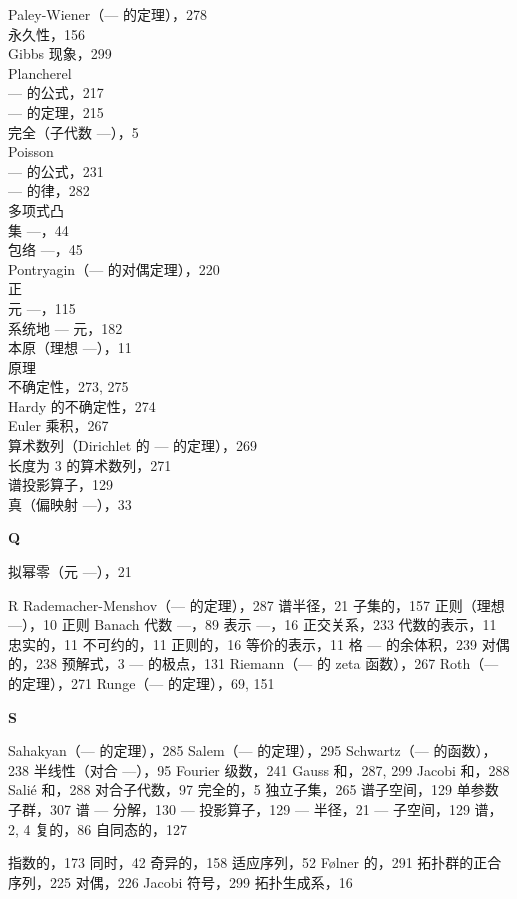 Paley-Wiener（--- 的定理），278\\
永久性，156\\
Gibbs 现象，299\\
Plancherel\\
--- 的公式，217\\
--- 的定理，215\\
完全（子代数 ---），5\\
Poisson\\
--- 的公式，231\\
--- 的律，282\\
多项式凸\\
集 ---，44\\
包络 ---，45\\
Pontryagin（--- 的对偶定理），220\\
正\\
元 ---，115\\
系统地 --- 元，182\\
本原（理想 ---），11\\
原理\\
不确定性，273, 275\\
Hardy 的不确定性，274\\
Euler 乘积，267\\
算术数列（Dirichlet 的 --- 的定理），269\\
长度为 3 的算术数列，271\\
谱投影算子，129\\
真（偏映射 ---），33

\textbf{Q}

拟幂零（元 ---），21

R Rademacher-Menshov（--- 的定理），287 谱半径，21 子集的，157 正则（理想 ---），10 正则 Banach 代数 ---，89 表示 ---，16 正交关系，233 代数的表示，11 忠实的，11 不可约的，11 正则的，16 等价的表示，11 格 --- 的余体积，239 对偶的，238 预解式，3 --- 的极点，131 Riemann（--- 的 zeta 函数），267 Roth（--- 的定理），271 Runge（--- 的定理），69, 151

\textbf{S}

Sahakyan（--- 的定理），285 Salem（--- 的定理），295 Schwartz（--- 的函数），238 半线性（对合 ---），95 Fourier 级数，241 Gauss 和，287, 299 Jacobi 和，288 Salié 和，288 对合子代数，97 完全的，5 独立子集，265 谱子空间，129 单参数子群，307 谱 --- 分解，130 --- 投影算子，129 --- 半径，21 --- 子空间，129 谱，2, 4 复的，86 自同态的，127

指数的，173 同时，42 奇异的，158 适应序列，52 Følner 的，291 拓扑群的正合序列，225 对偶，226 Jacobi 符号，299 拓扑生成系，16

